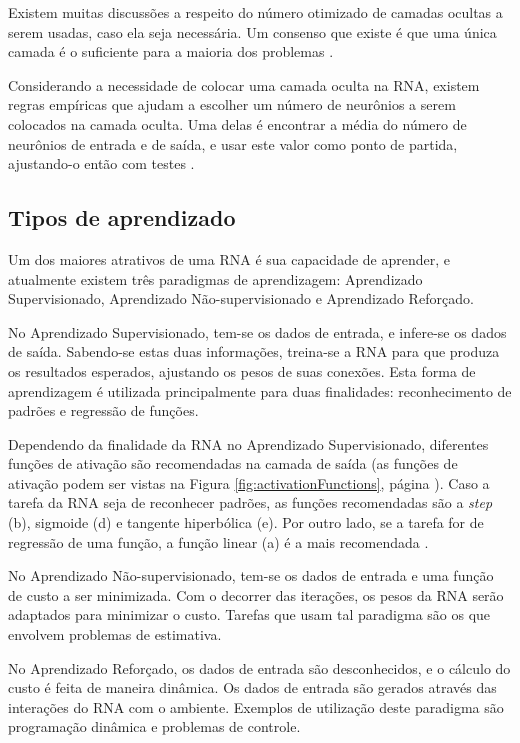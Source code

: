 \documentclass[
	12pt,					%
	openright,				%
	oneside,				%
	a4paper,				%
	bibjustif,				%
	chapter=TITLE,			%
	english,				%
	brazil,					%
	]{abntex2}
\begin{document}
	Existem muitas discussões a respeito do número otimizado de camadas ocultas a serem usadas, caso ela seja necessária.
	Um consenso que existe é que uma única camada é o suficiente para a maioria dos problemas
	\cite{stackExchange1}.
	
	Considerando a necessidade de colocar uma camada oculta na RNA,
	existem regras empíricas que ajudam a escolher um número de neurônios a serem colocados na camada oculta.
	Uma delas é encontrar a média do número de neurônios de entrada e de saída,
	e usar este valor como ponto de partida,
	ajustando-o então com testes
	\cite{stackExchange1}.
	
	\subsection{Tipos de aprendizado}
	Um dos maiores atrativos de uma RNA é sua capacidade de aprender,
	e atualmente existem três paradigmas de aprendizagem:
	Aprendizado Supervisionado, Aprendizado Não-supervisionado e Aprendizado Reforçado.
	
	No Aprendizado Supervisionado,
	tem-se os dados de entrada, e infere-se os dados de saída.
	Sabendo-se estas duas informações, treina-se a RNA para que produza os resultados esperados,
	ajustando os pesos de suas conexões.
	Esta forma de aprendizagem é utilizada principalmente para duas finalidades:
	reconhecimento de padrões e regressão de funções.
	
	Dependendo da finalidade da RNA no Aprendizado Supervisionado,
	diferentes funções de ativação são recomendadas na camada de saída
	(as funções de ativação podem ser vistas na Figura \ref{fig:activationFunctions}, página \pageref{fig:activationFunctions}).
	Caso a tarefa da RNA seja de reconhecer padrões,
	as funções recomendadas são a \textit{step} (b), sigmoide (d) e tangente hiperbólica (e).
	Por outro lado, se a tarefa for de regressão de uma função,
	a função linear (a) é a mais recomendada \cite{researchGate}.
	
	No Aprendizado Não-supervisionado,
	tem-se os dados de entrada e uma função de custo a ser minimizada.
	Com o decorrer das iterações,
	os pesos da RNA serão adaptados para minimizar o custo.
	Tarefas que usam tal paradigma são os que envolvem problemas de estimativa.
	
	No Aprendizado Reforçado,
	os dados de entrada são desconhecidos,
	e o cálculo do custo é feita de maneira dinâmica.
	Os dados de entrada são gerados através das interações do RNA com o ambiente.
	Exemplos de utilização deste paradigma são
	programação dinâmica e problemas de controle.
\end{document}
